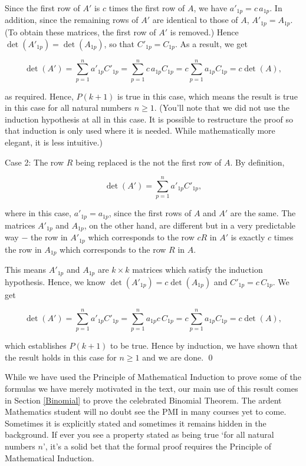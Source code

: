 \documentclass{ximera}
\begin{document}
\begin{example}
\begin{enumerate}
Since the first row of $A'$ is $c$ times the first row of $A$,  we have $a'_{1p} = c \, a_{1p}$.  In addition, since the remaining rows of $A'$ are identical to those of $A$, $A'_{1p} = A_{1p}$.  (To obtain these matrices, the first row of $A'$ is removed.)  Hence $\det\left(A'_{1p}\right) = \det\left(A_{1p}\right)$, so that $C'_{1p} = C_{1p}$.  As a result, we get

\[ \det(A') = \displaystyle{\sum_{p=1}^{n} a'_{1p} C'_{1p}} = \displaystyle{\sum_{p=1}^{n} c \, a_{1p} C_{1p}} = c \displaystyle{\sum_{p=1}^{n} a_{1p} C_{1p}} = c \det(A), \]

as required.  Hence, $P(k+1)$ is true in this case, which means the result is true in this case for all natural numbers $n \geq 1$. (You'll note that we did not use the induction hypothesis at all in this case.  It is possible to restructure the proof so that induction is only used where it is needed.  While mathematically more elegant, it is less intuitive.)

{\sc Case 2:} The row $R$ being replaced is the not the first row of $A$.  By definition,

\[ \det(A') = \displaystyle{\sum_{p=1}^{n} a'_{1p} C'_{1p}},\]

where in this case, $a'_{1p} = a_{1p}$, since the first rows of $A$ and $A'$ are the same. The matrices $A'_{1p}$ and $A_{1p}$, on the other hand, are different but in a very predictable way $-$ the row in $A'_{1p}$ which corresponds to the row $cR$ in $A'$ is exactly $c$ times the row in $A_{1p}$ which corresponds to the row $R$ in $A$. 

 

This means $A'_{1p}$ and $A_{1p}$ are $k \times k$ matrices which satisfy the induction hypothesis.  Hence, we know $\det\left(A'_{1p}\right) = c \det\left(A_{1p}\right)$ and $C'_{1p} = c \, C_{1p}$.  We get

\[ \det(A') = \displaystyle{\sum_{p=1}^{n} a'_{1p} C'_{1p}} = \displaystyle{\sum_{p=1}^{n} a_{1p} c\, C_{1p}} = c \displaystyle{\sum_{p=1}^{n} a_{1p} C_{1p}} = c \det(A), \]

which establishes $P(k+1)$ to be true.  Hence by induction, we have shown that the result holds in this case for $n \geq 1$ and we are done.  \qed

\end{enumerate}

\end{example}

While we have used the Principle of Mathematical Induction to prove some of the formulas we have merely motivated in the text, our main use of this result comes in Section \ref{Binomial} to prove the celebrated Binomial Theorem.  The ardent Mathematics student will no doubt see the PMI in many courses yet to come.  Sometimes it is explicitly stated and sometimes it remains hidden in the background.  If ever you see a property stated as being true `for all natural numbers $n$', it's a solid bet that the formal proof requires the Principle of Mathematical Induction.



\closegraphsfile
\end{document}
